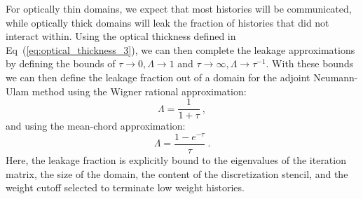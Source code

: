 For optically thin domains, we expect that most histories will be
communicated, while optically thick domains will leak the fraction of
histories that did not interact within. Using the optical thickness
defined in Eq~(\ref{eq:optical_thickness_3}), we can then complete the
leakage approximations by defining the bounds of $\tau \rightarrow 0,
\Lambda \rightarrow 1$ and $\tau \rightarrow \infty, \Lambda
\rightarrow \tau^{-1}$.  With these bounds we can then define the
leakage fraction out of a domain for the adjoint Neumann-Ulam method
using the Wigner rational approximation:
\begin{equation}
  \Lambda = \frac{1}{1+\tau}\:,
  \label{eq:wigner_domain_leakage}
\end{equation}
and using the mean-chord approximation:
\begin{equation}
  \Lambda = \frac{1-e^{-\tau}}{\tau}\:.
  \label{eq:mean_chord_domain_leakage}
\end{equation}
Here, the leakage fraction is explicitly bound to the eigenvalues of
the iteration matrix, the size of the domain, the content of the
discretization stencil, and the weight cutoff selected to terminate
low weight histories.

